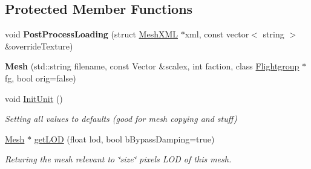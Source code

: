 \subsection*{Protected Member Functions}
\begin{DoxyCompactItemize}
\item 
void {\bfseries Post\+Process\+Loading} (struct \hyperlink{structMeshXML}{Mesh\+X\+ML} $\ast$xml, const vector$<$ string $>$ \&override\+Texture)\hypertarget{classMesh_aaa57f5d82264adc362ac9948033d3bf7}{}\label{classMesh_aaa57f5d82264adc362ac9948033d3bf7}

\item 
{\bfseries Mesh} (std\+::string filename, const Vector \&scalex, int faction, class \hyperlink{classFlightgroup}{Flightgroup} $\ast$fg, bool orig=false)\hypertarget{classMesh_a884f04c4db8acf2af8c56e54fbfa5248}{}\label{classMesh_a884f04c4db8acf2af8c56e54fbfa5248}

\item 
void \hyperlink{classMesh_a9fe9ce7e90581f1b4eb58717066cd476}{Init\+Unit} ()\hypertarget{classMesh_a9fe9ce7e90581f1b4eb58717066cd476}{}\label{classMesh_a9fe9ce7e90581f1b4eb58717066cd476}

\begin{DoxyCompactList}\small\item\em Setting all values to defaults (good for mesh copying and stuff) \end{DoxyCompactList}\item 
\hyperlink{classMesh}{Mesh} $\ast$ \hyperlink{classMesh_a730c79719e8629ed9b3cf13dcd470b32}{get\+L\+OD} (float lod, bool b\+Bypass\+Damping=true)\hypertarget{classMesh_a730c79719e8629ed9b3cf13dcd470b32}{}\label{classMesh_a730c79719e8629ed9b3cf13dcd470b32}

\begin{DoxyCompactList}\small\item\em Returing the mesh relevant to \char`\"{}size\char`\"{} pixels L\+OD of this mesh. \end{DoxyCompactList}\end{DoxyCompactItemize}
